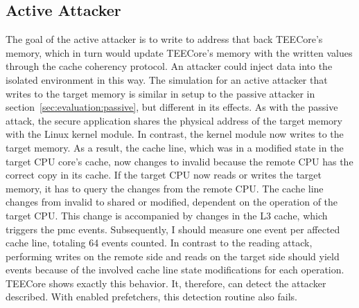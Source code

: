 \subsection{Active Attacker}
\label{sec:evaluation:active}
The goal of the active attacker is to write to address that back TEECore's
memory, which in turn would update TEECore's memory with the written values
through the cache coherency protocol. An attacker could inject data into the
isolated environment in this way. The simulation for an active attacker that
writes to the target memory is similar in setup to the passive attacker in
section~\ref{sec:evaluation:passive}, but different in its effects. As with the
passive attack, the secure application shares the physical address of the target
memory with the Linux kernel module. In contrast, the kernel module now writes
to the target memory. As a result, the cache line, which was in a modified state
in the target CPU core's cache, now changes to invalid because the remote CPU
has the correct copy in its cache. If the target CPU now reads or writes the
target memory, it has to query the changes from the remote CPU. The cache line
changes from invalid to shared or modified, dependent on the operation of the
target CPU. This change is accompanied by changes in the L3 cache, which
triggers the \gls{pmc} events. Subsequently, I should measure one event per
affected cache line, totaling 64 events counted. In contrast to the reading
attack, performing writes on the remote side and reads on the target side should
yield events because of the involved cache line state modifications for each
operation. TEECore shows exactly this behavior. It, therefore, can detect the
attacker described. With enabled prefetchers, this detection routine also
fails.\\

